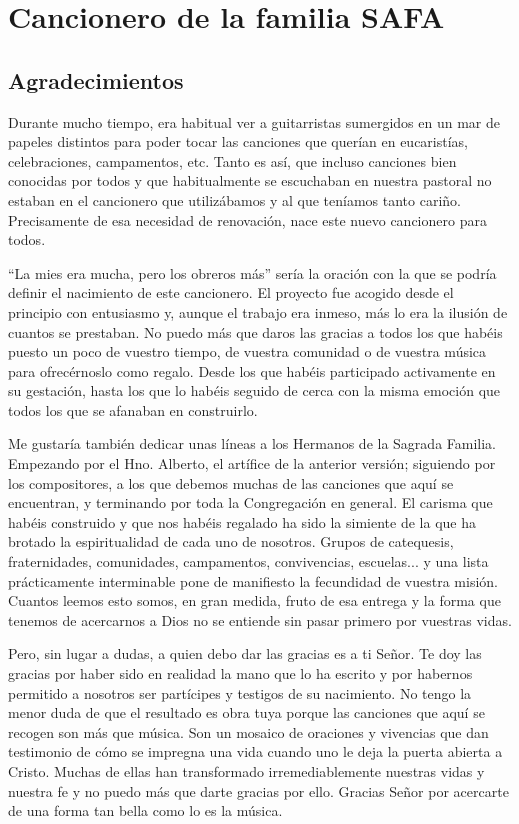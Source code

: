 \chapter*{Cancionero de la familia SAFA}
\section*{Agradecimientos}

Durante mucho tiempo, era habitual ver a guitarristas sumergidos en un mar de papeles distintos para poder tocar las canciones que querían en eucaristías, celebraciones, campamentos, etc. Tanto es así, que incluso canciones bien conocidas por todos y que habitualmente se escuchaban en nuestra pastoral no estaban en el cancionero que utilizábamos y al que teníamos tanto cariño. Precisamente de esa necesidad de renovación, nace este nuevo cancionero para todos.

``La mies era mucha, pero los obreros más'' sería la oración con la que se podría definir el nacimiento de este cancionero. El proyecto fue acogido desde el principio con entusiasmo y, aunque el trabajo era inmeso, más lo era la ilusión de cuantos se prestaban. No puedo más que daros las gracias a todos los que habéis puesto un poco de vuestro tiempo, de vuestra comunidad o de vuestra música para ofrecérnoslo como regalo. Desde los que habéis participado activamente en su gestación, hasta los que lo habéis seguido de cerca con la misma emoción que todos los que se afanaban en construirlo.

Me gustaría también dedicar unas líneas a los Hermanos de la Sagrada Familia. Empezando por el Hno. Alberto, el artífice de la anterior versión; siguiendo por los compositores, a los que debemos muchas de las canciones que aquí se encuentran, y terminando por toda la Congregación en general. El carisma que habéis construido y que nos habéis regalado ha sido la simiente de la que ha brotado la espiritualidad de cada uno de nosotros. Grupos de catequesis, fraternidades, comunidades, campamentos, convivencias, escuelas... y una lista prácticamente interminable pone de manifiesto la fecundidad de vuestra misión. Cuantos leemos esto somos, en gran medida, fruto de esa entrega y la forma que tenemos de acercarnos a Dios no se entiende sin pasar primero por vuestras vidas.

Pero, sin lugar a dudas, a quien debo dar las gracias es a ti Señor. Te doy las gracias por haber sido en realidad la mano que lo ha escrito y por habernos permitido a nosotros ser partícipes y testigos de su nacimiento. No tengo la menor duda de que el resultado es obra tuya porque las canciones que aquí se recogen son más que música. Son un mosaico de oraciones y vivencias que dan testimonio de cómo se impregna una vida cuando uno le deja la puerta abierta a Cristo. Muchas de ellas han transformado irremediablemente nuestras vidas y nuestra fe y no puedo más que darte gracias por ello. Gracias Señor por acercarte de una forma tan bella como lo es la música.

